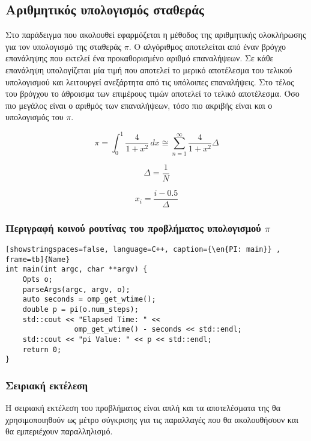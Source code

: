 \clearpage
{}

\subsection{Αριθμητικός υπολογισμός σταθεράς \en{$\pi$}}
Στο παράδειγμα που ακολουθεί εφαρμόζεται 	η μέθοδος της αριθμητικής ολοκλήρωσης για τον υπολογισμό της σταθεράς $\pi$. Ο αλγόριθμος αποτελείται από έναν βρόγχο επανάληψης που εκτελεί ένα προκαθορισμένο αριθμό επαναλήψεων. Σε κάθε επανάληψη υπολογίζεται μία τιμή  που αποτελεί το μερικό αποτέλεσμα του τελικού υπολογισμού και λειτουργεί ανεξάρτητα από τις υπόλοιπες επαναλήψεις. Στο τέλος του βρόγχου το άθροισμα των επιμέρους τιμών αποτελεί το τελικό αποτέλεσμα. Όσο πιο μεγάλος είναι ο αριθμός των επαναλήψεων, τόσο πιο ακριβής είναι και ο υπολογισμός του $\pi$.


\[ \pi   =   \int_{0}^{1} \frac{4}{1 + x ^2} \,dx    \cong   \sum_{n=1}^{\infty} \frac{4}{1 + x ^2}\Delta \]

\[ \Delta = \frac{1}{N} \]

\[ x_i = \frac{i - 0.5}{\Delta} \] 


\subsubsection{Περιγραφή κοινού ρουτίνας  του προβλήματος υπολογισμού $\pi$}
\mbox{}

\begin{spacing}{1.0}

\begin{lstlisting}[showstringspaces=false, language=C++, caption={\en{PI: main}} , frame=tb]{Name}
int main(int argc, char **argv) {
    Opts o;
    parseArgs(argc, argv, o);
    auto seconds = omp_get_wtime();
    double p = pi(o.num_steps);
    std::cout << "Elapsed Time: " << 
    			omp_get_wtime() - seconds << std::endl;
    std::cout << "pi Value: " << p << std::endl;
    return 0;
}
\end{lstlisting}
\end{spacing}
\clearpage
\subsubsection{Σειριακή εκτέλεση}
Η σειριακή εκτέλεση του προβλήματος είναι απλή και τα αποτελέσματα της θα χρησιμοποιηθούν ως μέτρο σύγκρισης για τις παραλλαγές που θα ακολουθήσουν και θα εμπεριέχουν παραλληλισμό.

